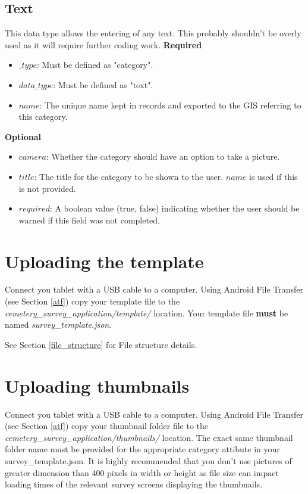 \documentclass{scrreprt}
\begin{document}
\newpage
\subsection{Text}
This data type allows the entering of any text. This probably shouldn't be overly used as it will require further coding work.
\textbf{Required}
\begin{itemize}
\item $\_type$:  Must be defined as "category".
\item $data\_type$: Must be defined as "text".
\item $name$: The unique name kept in records and exported to the GIS referring to this category.
\end{itemize}
\textbf{Optional}
\begin{itemize}
\item $camera$: Whether the category should have an option to take a picture.
\item $title$: The title for the category to be shown to the user. $name$ is used if this is not provided.
\item $required$: A boolean value (true, false) indicating whether the user should be warned if this field was not completed.
\end{itemize}

\section{Uploading the template}
Connect you tablet with a USB cable to a computer. Using Android File Transfer (see Section \ref{atf}) copy your template file to the \textit{cemetery_survey_application/template/} location. Your template file \textbf{must} be named \textit{survey_template.json}.

See Section \ref{file_structure} for File structure details.

\section{Uploading thumbnails}
\label{upload_thumbnails}
Connect you tablet with a USB cable to a computer. Using Android File Transfer (see Section \ref{atf}) copy your thumbnail folder file to the \textit{cemetery_survey_application/thumbnails/} location. The exact same thumbnail folder name must be provided for the appropriate category attibute in your survey_template.json. It is highly recommended that you don't use pictures of greater dimension than 400 pixels in width or height as file size can impact loading times of the relevant survey screens displaying the thumbnails.
\end{document}
